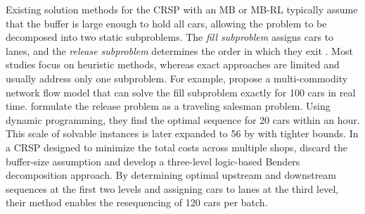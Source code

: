 \documentclass[12pt]{article}
\begin{document}
Existing solution methods for the CRSP with an MB or MB-RL typically assume that the buffer is large enough to hold all cars, allowing the problem to be decomposed into two static subproblems. The \textit{fill subproblem} assigns cars to lanes, and the \textit{release subproblem} determines the order in which they exit \citep{boysen2013decomposition}. Most studies focus on heuristic methods, whereas exact approaches are limited and usually address only one subproblem. For example, \citet{elahi2015optimizing} propose a multi-commodity network flow model that can solve the fill subproblem exactly for 100 cars in real time. \citet{ko2016paint} formulate the release problem as a traveling salesman problem. Using dynamic programming, they find the optimal sequence for 20 cars within an hour. This scale of solvable instances is later expanded to 56 by \citet{hong2018accelerated} with tighter bounds. In a CRSP designed to minimize the total costs across multiple shops, \citet{guo2025logic} discard the buffer-size assumption and develop a three-level logic-based Benders decomposition approach. By determining optimal upstream and downstream sequences at the first two levels and assigning cars to lanes at the third level, their method enables the resequencing of 120 cars per batch.

\end{document}
